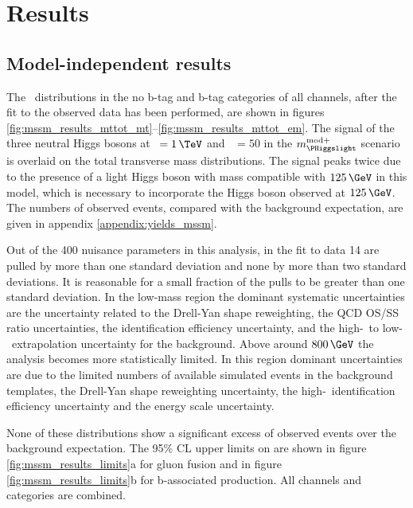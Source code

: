 \vspace{-1\baselineskip}
\section{Results}
\label{sec:mssm_results}
\subsection{Model-independent results}
\label{sec:mssm_results_modelindep}
The \mTtot~distributions in the no b-tag and b-tag
categories of all channels, after the fit to the observed
data has been performed, are shown in figures \ref{fig:mssm_results_mttot_mt}--\ref{fig:mssm_results_mttot_em}.
The signal of the three neutral Higgs bosons at \mA~$=1\,\TeV$ and \tanb~$=50$ in the $m_{\PHiggslight}^{\text{mod+}}$ scenario is overlaid 
on the total transverse mass distributions. The signal peaks twice due to the presence of a light Higgs boson
with mass compatible with $125\,\GeV$ in this model, which is necessary to incorporate the Higgs boson
observed at $125\,\GeV$. The numbers of observed events, compared with the background expectation, are given in 
appendix \ref{appendix:yields_mssm}.

Out of the 400 nuisance parameters in this analysis, in the fit to data 14 are pulled by more than one standard deviation and 
none by more than two standard deviations. It is reasonable for a small fraction of the pulls to be greater than one standard deviation.
In the low-mass region the dominant systematic uncertainties are the uncertainty related to the Drell-Yan shape reweighting, 
the QCD OS/SS ratio uncertainties, the \Pgth identification efficiency uncertainty, and the high-\mT~to low-\mT~extrapolation uncertainty for the \Wjets background.
Above around $800\,\GeV$ the analysis becomes more statistically limited. In this region dominant uncertainties are due to the limited numbers of available simulated events in the 
background templates, the Drell-Yan shape reweighting uncertainty, the high-\pT~\Pgth identification efficiency uncertainty and the \Pgth energy scale uncertainty. 

None of these distributions show a significant excess of observed events over the background
expectation. The
95\% \ac{CL} upper limits on \xsbr are shown in figure \ref{fig:mssm_results_limits}a
for gluon fusion and in figure \ref{fig:mssm_results_limits}b for b-associated
production. All channels and categories are combined. 


